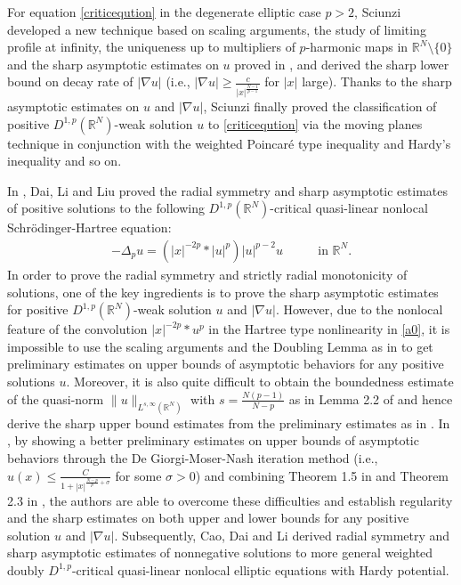 \documentclass[12pt]{amsart}
\theoremstyle{definition}
\theoremstyle{remark}
\theoremstyle{conclusion}
\theoremstyle{conjecture}
\numberwithin{equation}{section}
\newcommand{\R}{\mathbb{R}}
\begin{document}
\smallskip

For equation \eqref{criticeqution} in the degenerate elliptic case $p>2$, Sciunzi \cite{BS16} developed a new technique based on scaling arguments, the study of limiting profile at infinity, the uniqueness up to multipliers of $p$-harmonic maps in $\mathbb{R}^{N}\setminus\{0\}$ and the sharp asymptotic estimates on $u$ proved in \cite{VJ16}, and derived the sharp lower bound on decay rate of $|\nabla u|$ (i.e., $|\nabla u|\geq \frac{c}{|x|^{\frac{N-1}{p-1}}}$ for $|x|$ large). Thanks to the sharp asymptotic estimates on $u$ and $|\nabla u|$, Sciunzi \cite{BS16} finally proved the classification of positive $D^{1,p}(\R^N)$-weak solution $u$ to \eqref{criticeqution} via the moving planes technique in conjunction with the weighted Poincar\'{e} type inequality and Hardy's inequality and so on.

\smallskip

In \cite{DLL}, Dai, Li and Liu proved the radial symmetry and sharp asymptotic estimates of positive solutions to the following $D^{1,p}(\R^{N})$-critical quasi-linear nonlocal Schr\"{o}dinger-Hartree equation:
\begin{align}\label{a0}
-\Delta_p u =\left(|x|^{-2p}\ast |u|^{p}\right)|u|^{p-2}u \qquad &\mbox{in} \,\, \mathbb{R}^N.
\end{align}
In order to prove the radial symmetry and strictly radial monotonicity of solutions, one of the key ingredients is to prove the sharp asymptotic estimates for positive $D^{1,p}(\R^N)$-weak solution $u$ and $|\nabla u|$. However, due to the nonlocal feature of the convolution $|x|^{-2p}*u^p$ in the Hartree type nonlinearity in \eqref{a0}, it is impossible to use the scaling arguments and the Doubling Lemma as in \cite{VJ16} to get preliminary estimates on upper bounds of asymptotic behaviors for any positive solutions $u$. Moreover, it is also quite difficult to obtain the boundedness estimate of the quasi-norm $\|u \|_{L^{s,\infty}(\R^N)}$ with $s=\frac{N(p-1)}{N-p}$ as in Lemma 2.2 of \cite{VJ16} and hence derive the sharp upper bound estimates from the preliminary estimates as in \cite{VJ16}. In \cite{DLL}, by showing a better preliminary estimates on upper bounds of asymptotic behaviors through the De Giorgi-Moser-Nash iteration method (i.e., $u(x) \leq\frac{C}{1+|x|^{\frac{N-p}{p}+\sigma}}$ for some $\sigma>0$) and combining Theorem 1.5 in \cite{XCL} and Theorem 2.3 in \cite{SJZH02}, the authors are able to overcome these difficulties and establish regularity and the sharp estimates on both upper and lower bounds for any positive solution $u$ and $|\nabla u|$. Subsequently, Cao, Dai and Li \cite{CDL} derived radial symmetry and sharp asymptotic estimates of nonnegative solutions to more general weighted doubly $D^{1,p}$-critical quasi-linear nonlocal elliptic equations with Hardy potential.
\end{document}
